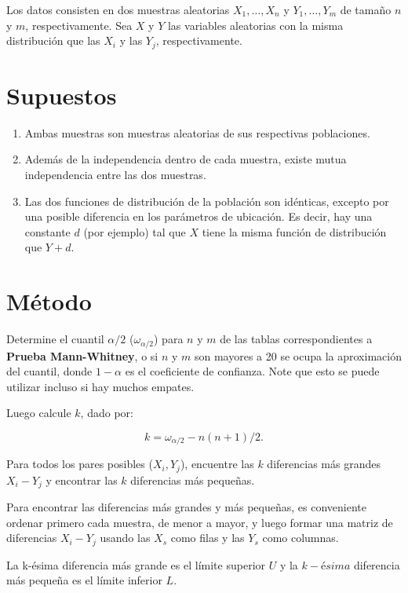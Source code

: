 \documentclass[
  a4paper,
  oneside,
  openany]{book}
\begin{document}
Los datos consisten en dos muestras aleatorias \(X_{1}, \ldots, X_{n}\) y \(Y_{1}, \ldots, Y_{m}\) de tamaño \(n\) y \(m\), respectivamente. Sea \(X\) y \(Y\) las variables aleatorias con la misma distribución que las \(X_{i}\) y las \(Y_{j}\), respectivamente.

\hypertarget{supuestos-6}{%
\section{Supuestos}\label{supuestos-6}}

\begin{enumerate}
\def\labelenumi{\arabic{enumi})}
\item
  Ambas muestras son muestras aleatorias de sus respectivas poblaciones.
\item
  Además de la independencia dentro de cada muestra, existe mutua independencia entre las dos muestras.
\item
  Las dos funciones de distribución de la población son idénticas, excepto por una posible diferencia en los parámetros de ubicación. Es decir, hay una constante \(d\) (por ejemplo) tal que \(X\) tiene la misma función de distribución que \(Y + d\).
\end{enumerate}

\hypertarget{muxe9todo}{%
\section{Método}\label{muxe9todo}}

Determine el cuantil \(\alpha/2\) (\(\omega_{\alpha/2}\)) para \(n\) y \(m\) de las tablas correspondientes a \textbf{Prueba Mann-Whitney}, o si \(n\) y \(m\) son mayores a 20 se ocupa la aproximación del cuantil, donde \(1-\alpha\) es el coeficiente de confianza. Note que esto se puede utilizar incluso si hay muchos empates.

Luego calcule \(k\), dado por:

\[k= \omega_{\alpha/2}-n(n+1)/2.\]

Para todos los pares posibles (\(X_{i},Y_{j}\)), encuentre las \(k\) diferencias más grandes \(X_{i}-Y_{j}\) y encontrar las \(k\) diferencias más pequeñas.

Para encontrar las diferencias más grandes y más pequeñas, es conveniente ordenar primero cada muestra, de menor a mayor, y luego formar una matriz de diferencias \(X_{i}-Y_{j}\) usando las \(X_s\) como filas y las \(Y_s\) como columnas.

La k-ésima diferencia más grande es el límite superior \(U\) y la \(k-ésima\) diferencia más pequeña es el límite inferior \(L\).
\end{document}

